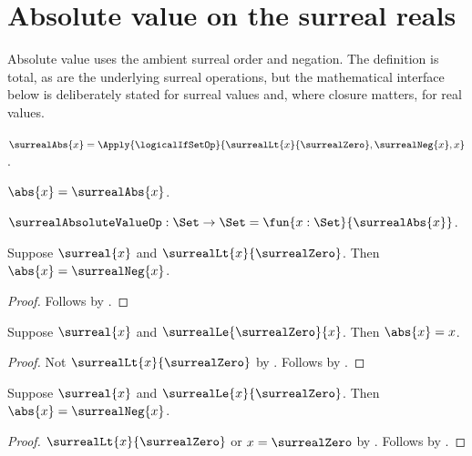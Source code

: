 


\section{Absolute value on the surreal reals}

Absolute value uses the ambient surreal order and negation.  The definition
is total, as are the underlying surreal operations, but the mathematical
interface below is deliberately stated for surreal values and, where closure
matters, for real values.

\begin{definition}\label{surreal_absolute_value}
    $\surrealAbs{x}=
        \Apply{\logicalIfSetOp}
            {\surrealLt{x}{\surrealZero},\surrealNeg{x},x}$.
\end{definition}

\begin{abbreviation}\label{surreal_absolute_value_notation}
    $\abs{x}=\surrealAbs{x}$.
\end{abbreviation}

\begin{definition}\label{surreal_absolute_value_op}
    $\surrealAbsoluteValueOp:\Set\to\Set
        =\fun{x:\Set}{\surrealAbs{x}}$.
\end{definition}

\begin{proposition}\label{surreal_abs_negative}
    Suppose $\surreal{x}$ and $\surrealLt{x}{\surrealZero}$.
    Then $\abs{x}=\surrealNeg{x}$.
\end{proposition}
\begin{proof}
    Follows by
        .
\end{proof}

\begin{proposition}\label{surreal_abs_nonnegative}
    Suppose $\surreal{x}$ and $\surrealLe{\surrealZero}{x}$.
    Then $\abs{x}=x$.
\end{proposition}
\begin{proof}
    Not $\surrealLt{x}{\surrealZero}$
        by
        .
    Follows by
        .
\end{proof}

\begin{proposition}\label{surreal_abs_nonpositive}
    Suppose $\surreal{x}$ and $\surrealLe{x}{\surrealZero}$.
    Then $\abs{x}=\surrealNeg{x}$.
\end{proposition}
\begin{proof}
    $\surrealLt{x}{\surrealZero}$ or $x=\surrealZero$
        by .
    Follows by
        .
\end{proof}

